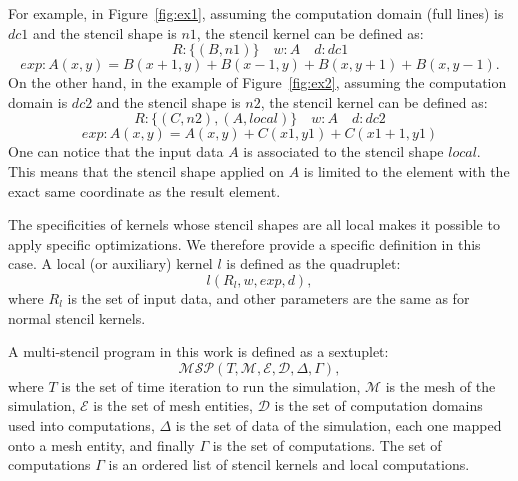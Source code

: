 For example, in Figure~\ref{fig:ex1}, assuming the computation domain (full lines) is $dc1$ and the stencil shape is $n1$, the stencil kernel can be defined as:
\begin{equation*}
R: \{(B,n1)\} \quad w: A \quad d: dc1
\end{equation*}
\begin{equation*}
exp: A(x,y)=B(x+1,y)+B(x-1,y)+B(x,y+1)+B(x,y-1).
\end{equation*}
On the other hand, in the example of Figure~\ref{fig:ex2}, assuming the computation domain is $dc2$ and the stencil shape is $n2$, the stencil kernel can be defined as:
\begin{equation*}
R: \{(C,n2),(A,local)\} \quad w: A \quad d: dc2
\end{equation*}
\begin{equation*}
exp: A(x,y)=A(x,y)+C(x1,y1)+C(x1+1,y1)
\end{equation*}
One can notice that the input data $A$ is associated to the stencil shape $local$. This means that the stencil shape applied on $A$ is limited to the element with the exact same coordinate as the result element.

The specificities of kernels whose stencil shapes are all local makes it possible to apply specific optimizations.
We therefore provide a specific definition in this case.
A local (or auxiliary) kernel $l$ is defined as the quadruplet:
\begin{equation} 
l(R_l,w,exp,d),
\label{eq:loc}
\end{equation}
where $R_l$ is the set of input data, and other parameters are the same as for normal stencil kernels.

A multi-stencil program in this work is defined as a sextuplet:
\begin{equation} 
\mathcal{MSP}(T,\mathcal{M},\mathcal{E},\mathcal{D},\Delta,\Gamma),
\label{eq:msp}
\end{equation}
where $T$ is the set of time iteration to run the simulation, $\mathcal{M}$ is the mesh of the simulation, $\mathcal{E}$ is the set of mesh entities, $\mathcal{D}$ is the set of computation domains used into computations, $\Delta$ is the set of data of the simulation, each one mapped onto a mesh entity, and finally $\Gamma$ is the set of computations. The set of computations $\Gamma$ is an ordered list of stencil kernels and local computations. 


